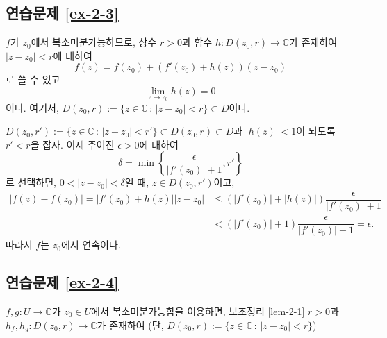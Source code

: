 \subsection*{연습문제 \ref{ex-2-3}}

$f$가 $z_0$에서 복소미분가능하므로,
상수 $r>0$과 함수 $h:D(z_0,r)\to \mathbb C$가 존재하여
$|z-z_0|<r$에 대하여
\[
f(z) = f(z_0) + (f'(z_0) + h(z))(z-z_0)
\]
로 쓸 수 있고
\[
\lim_{z\to z_0} h(z) = 0
\]
이다.
여기서, $D(z_0,r):= \{ z\in \mathbb C \,:\, |z-z_0| < r\} \subset D$이다.

$D(z_0,r'):= \{ z\in \mathbb C \,:\, |z-z_0| < r'\} \subset D(z_0,r) \subset D$과
$|h(z)|<1$이 되도록 $r'<r$을 잡자.
이제 주어진 $\epsilon>0$에 대하여
\[
\delta = \min\left\{ \dfrac\epsilon{|f'(z_0)|+1}, r' \right\}
\]
로 선택하면, $0<|z-z_0|<\delta$일 때, 
$z\in D(z_0, r')$이고,
\begin{align*}
|f(z) - f(z_0)| = |f'(z_0) + h(z)||z-z_0|
&\le ( |f'(z_0)|+|h(z)|)\dfrac{\epsilon}{ |f'(z_0)|+1} \\
&< ( |f'(z_0)|+1)  \dfrac{\epsilon}{|f'(z_0)|+1} = \epsilon.
\end{align*}
따라서 $f$는 $z_0$에서 연속이다.

\subsection*{연습문제 \ref{ex-2-4}}

$f,g:U\to \mathbb C$가 $z_0\in U$에서 복소미분가능함을 이용하면,
보조정리 \ref{lem-2-1}
$r>0$과 $h_f, h_g: D(z_0,r) \to \mathbb C$가 존재하여
(단, $D(z_0,r):= \{ z\in \mathbb C \,:\, |z-z_0| < r\}$)

